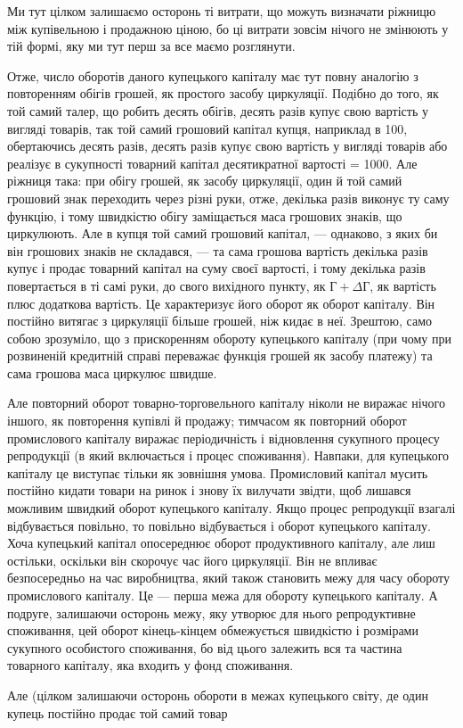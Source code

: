 
Ми тут цілком залишаємо осторонь ті витрати, що можуть
визначати ріжницю між купівельною і продажною ціною, бо ці
витрати зовсім нічого не змінюють у тій формі, яку ми тут
перш за все маємо розглянути.

Отже, число оборотів даного купецького капіталу має
тут повну аналогію з повторенням обігів грошей, як простого
засобу циркуляції. Подібно до того, як той самий талер, що
робить десять обігів, десять разів купує свою вартість у вигляді
товарів, так той самий грошовий капітал купця, наприклад
в 100, обертаючись десять разів, десять разів купує свою вартість
у вигляді товарів або реалізує в сукупності товарний капітал
десятикратної вартості = 1000. Але ріжниця така: при обігу
грошей, як засобу циркуляції, один й той самий грошовий знак
переходить через різні руки, отже, декілька разів виконує ту
саму функцію, і тому швидкістю обігу заміщається маса грошових
знаків, що циркулюють. Але в купця той самий грошовий
капітал, — однаково, з яких би він грошових знаків не складався, —
та сама грошова вартість декілька разів купує і продає товарний
капітал на суму своєї вартості, і тому декілька разів повертається
в ті самі руки, до свого вихідного пункту, як $Г + ΔГ$,
як вартість плюс додаткова вартість. Це характеризує його
оборот як оборот капіталу. Він постійно витягає з циркуляції
більше грошей, ніж кидає в неї. Зрештою, само собою зрозуміло,
що з прискоренням обороту купецького капіталу (при чому при
розвиненій кредитній справі переважає функція грошей як засобу
платежу) та сама грошова маса циркулює швидше.

Але повторний оборот товарно-торговельного капіталу ніколи
не виражає нічого іншого, як повторення купівлі й продажу;
тимчасом як повторний оборот промислового капіталу виражає
періодичність і відновлення сукупного процесу репродукції (в
який включається і процес споживання). Навпаки, для купецького
капіталу це виступає тільки як зовнішня умова. Промисловий
капітал мусить постійно кидати товари на ринок і знову їх вилучати
звідти, щоб лишався можливим швидкий оборот купецького
капіталу. Якщо процес репродукції взагалі відбувається
повільно, то повільно відбувається і оборот купецького капіталу.
Хоча купецький капітал опосереднює оборот продуктивного
капіталу, але лиш остільки, оскільки він скорочує час його циркуляції.
Він не впливає безпосередньо на час виробництва, який
також становить межу для часу обороту промислового капіталу.
Це — перша межа для обороту купецького капіталу. А подруге,
залишаючи осторонь межу, яку утворює для нього репродуктивне
споживання, цей оборот кінець-кінцем обмежується швидкістю
і розмірами сукупного особистого споживання, бо від цього
залежить вся та частина товарного капіталу, яка входить у фонд
споживання.

Але (цілком залишаючи осторонь обороти в межах купецького
світу, де один купець постійно продає той самий товар
\parbreak{}  %
